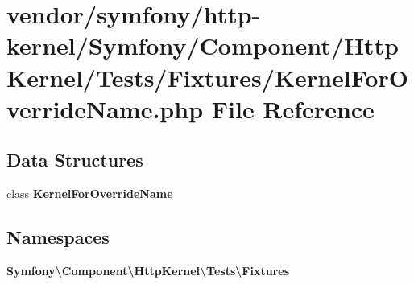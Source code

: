 \section{vendor/symfony/http-\/kernel/\+Symfony/\+Component/\+Http\+Kernel/\+Tests/\+Fixtures/\+Kernel\+For\+Override\+Name.php File Reference}
\label{_kernel_for_override_name_8php}
\subsection*{Data Structures}
\begin{DoxyCompactItemize}
\item 
class {\bf Kernel\+For\+Override\+Name}
\end{DoxyCompactItemize}
\subsection*{Namespaces}
\begin{DoxyCompactItemize}
\item 
 {\bf Symfony\textbackslash{}\+Component\textbackslash{}\+Http\+Kernel\textbackslash{}\+Tests\textbackslash{}\+Fixtures}
\end{DoxyCompactItemize}

